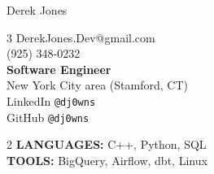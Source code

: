\documentclass[10pt,oneside]{article}
\makeatletter
\newcommand{\name}{Derek Jones}
\newcommand{\cellphone}{(925) 348-0232}
\newcommand{\email}{DerekJones.Dev@gmail.com}
\newcommand{\github}{GitHub \texttt{@dj0wns}}
\newcommand{\linkedin}{LinkedIn \texttt{@dj0wns}}
\newcommand{\languages}{C++, Python, SQL}
\newcommand{\tools}{BigQuery, Airflow, dbt, Linux}
\newcommand{\bigname}[1]{
  \begin{center}\huge#1\end{center}
}
\makeatother
\begin{document}
 \selectfont

\bigname{\name}
\vspace{-5pt}
\begin{flushleft}
 \begin{multicols}{3}
  \email \\
  \cellphone \\
  \centering \textbf{Software Engineer} \\
  \centering New York City area (Stamford, CT) \\
  \hfill\linkedin \\
  \hfill\github \\
 \end{multicols}
\end{flushleft}

\begin{center}
 \begin{multicols}{2}
  \textbf{\uppercase{Languages}:} \languages \\
  \textbf{\uppercase{Tools}:} \tools \\
 \end{multicols}
\end{center}

\vspace{-5 pt}
\end{document}
